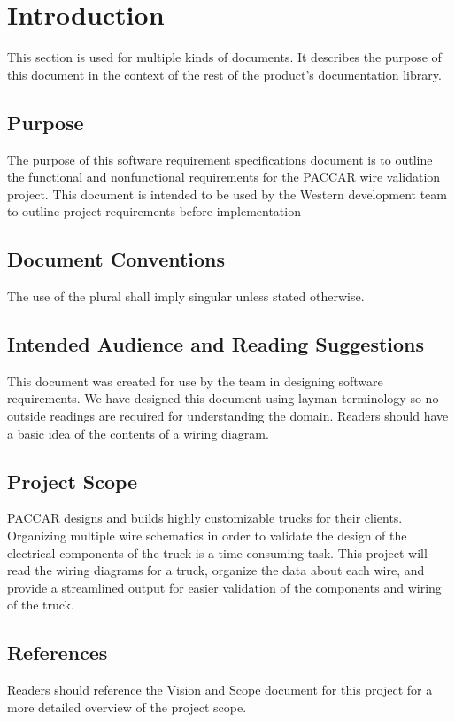 \section{Introduction}
 This section is used for multiple kinds of documents.  It describes the
 purpose of this document in the context of the rest of the product's
 documentation library.  

\subsection{Purpose}
The purpose of this software requirement specifications document is to outline the functional and nonfunctional requirements for the PACCAR wire validation project. This document is intended to be used by the Western development team to outline project requirements before implementation

\subsection{Document Conventions}

 The use of the plural shall imply singular unless stated otherwise.
 

\subsection{Intended Audience and Reading Suggestions}
 This document was created for use by the team in designing software requirements. We have designed this document using layman terminology so no outside readings are required for understanding the domain. Readers should have a basic idea of the contents of a wiring diagram.

\subsection{Project Scope}
PACCAR designs and builds highly customizable trucks for their clients. Organizing multiple wire schematics in order to validate the design of the electrical components of the truck is a time-consuming task. This project will read the wiring diagrams for a truck, organize the data about each wire, and provide a streamlined output for easier validation of the components and wiring of the truck.

\subsection{References}
 Readers should reference the Vision and Scope document for this project for a more detailed overview of the project scope.
